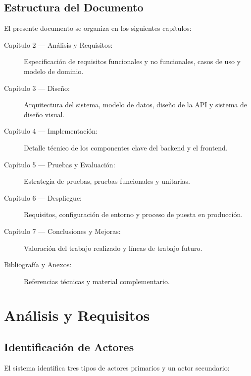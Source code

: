 \documentclass[12pt,a4paper,twoside]{report}
\begin{document}
\section{Estructura del Documento}

El presente documento se organiza en los siguientes capítulos:

\begin{description}
  \item[Capítulo 2 — Análisis y Requisitos:] Especificación de requisitos funcionales y no funcionales, casos de uso y modelo de dominio.
  \item[Capítulo 3 — Diseño:] Arquitectura del sistema, modelo de datos, diseño de la API y sistema de diseño visual.
  \item[Capítulo 4 — Implementación:] Detalle técnico de los componentes clave del backend y el frontend.
  \item[Capítulo 5 — Pruebas y Evaluación:] Estrategia de pruebas, pruebas funcionales y unitarias.
  \item[Capítulo 6 — Despliegue:] Requisitos, configuración de entorno y proceso de puesta en producción.
  \item[Capítulo 7 — Conclusiones y Mejoras:] Valoración del trabajo realizado y líneas de trabajo futuro.
  \item[Bibliografía y Anexos:] Referencias técnicas y material complementario.
\end{description}

\chapter{Análisis y Requisitos}

\section{Identificación de Actores}

El sistema identifica tres tipos de actores primarios y un actor secundario:
\end{document}
